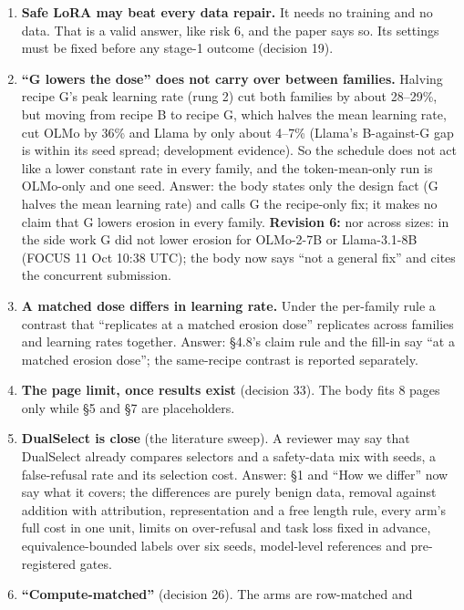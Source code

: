 \documentclass{article}
\theoremstyle{plain}
\theoremstyle{definition}
\theoremstyle{remark}
\begin{document}
\begin{enumerate}
        seed (FOCUS 11 Oct 10:40 UTC).
  \item \textbf{Safe LoRA may beat every data repair.} It needs no training and
        no data. That is a valid answer, like risk 6, and the paper says so. Its
        settings must be fixed before any stage-1 outcome (decision 19).
  \item \textbf{``G lowers the dose'' does not carry over between families.}
        Halving recipe G's peak learning rate (rung 2) cut both families by
        about 28--29\%, but moving from recipe B to recipe G, which halves the
        mean learning rate, cut OLMo by 36\% and Llama by only about 4--7\%
        (Llama's B-against-G gap is within its seed spread; development
        evidence). So the schedule does not act like a lower constant rate in
        every family, and the token-mean-only run is OLMo-only and one seed.
        Answer: the body states only the design fact (G halves the mean learning
        rate) and calls G the recipe-only fix; it makes no claim that G lowers
        erosion in every family. \textbf{Revision 6:} nor across sizes: in the
        side work G did not lower erosion for OLMo-2-7B or Llama-3.1-8B (FOCUS
        11 Oct 10:38 UTC); the body now says ``not a general fix'' and cites the
        concurrent submission.
  \item \textbf{A matched dose differs in learning rate.} Under the per-family
        rule a contrast that ``replicates at a matched erosion dose'' replicates
        across families and learning rates together. Answer: \S{}4.8's claim
        rule and the fill-in say ``at a matched erosion dose''; the same-recipe
        contrast is reported separately.
  \item \textbf{The page limit, once results exist} (decision 33). The body fits
        8 pages only while \S{}5 and \S{}7 are placeholders.
  \item \textbf{DualSelect is close} (the literature sweep). A reviewer may say
        that DualSelect already compares selectors and a safety-data mix with
        seeds, a false-refusal rate and its selection cost. Answer: \S{}1 and
        ``How we differ'' now say what it covers; the differences are purely
        benign data, removal against addition with attribution, representation
        and a free length rule, every arm's full cost in one unit, limits on
        over-refusal and task loss fixed in advance, equivalence-bounded labels
        over six seeds, model-level references and pre-registered gates.
  \item \textbf{``Compute-matched''} (decision 26). The arms are row-matched and

\end{enumerate}
\end{document}
